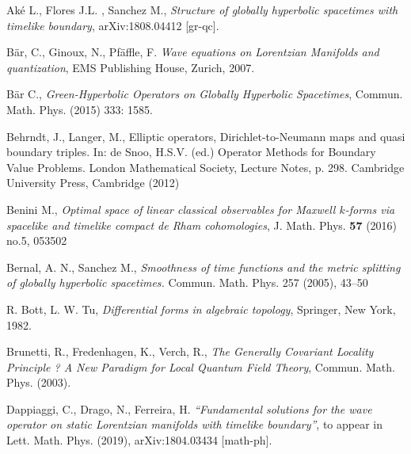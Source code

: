 \documentclass[
11pt,,a4paper %
]{book} %
\theoremstyle{TheoremStyle}
\theoremstyle{ExampleAndRemarkStyle}
\theoremstyle{ProofStyle}
\begin{document}


\begin{thebibliography}{}
	
	Ak\'e L., Flores J.L. , Sanchez M.,
	\textit{Structure of globally hyperbolic spacetimes with timelike boundary},
	arXiv:1808.04412 [gr-qc].
	
	B\"{a}r, C., Ginoux, N., Pf\"{a}ffle, F.
	\textit{Wave equations on Lorentzian Manifolds and quantization},
	EMS Publishing House,
	Zurich,
	2007.
	
	B\"ar C.,
	\textit{Green-Hyperbolic Operators on Globally Hyperbolic Spacetimes},
	Commun. Math. Phys. (2015) 333: 1585.
	
	Behrndt, J., Langer, M.,
	Elliptic operators, Dirichlet-to-Neumann maps and quasi boundary triples.
	In: de Snoo, H.S.V. (ed.) Operator Methods for Boundary Value Problems.
	London Mathematical Society, Lecture Notes, p. 298. Cambridge University Press, Cambridge (2012)
	
	Benini M.,
	\textit{Optimal space of linear classical observables for Maxwell $k$-forms via spacelike and timelike compact de Rham cohomologies},
	J. Math. Phys. {\bf 57} (2016) no.5,  053502
	
	Bernal, A. N., Sanchez M.,
	\textit{Smoothness of time functions and the metric splitting of globally hyperbolic spacetimes.} Commun. Math. Phys. 257 (2005), 43–50
	
	
	
	R. Bott, L. W. Tu,
	\textit{Differential forms in algebraic topology},
	Springer, New York, 1982.
	
	Brunetti, R., Fredenhagen, K., Verch, R.,
	\textit{The Generally Covariant Locality Principle ? A New Paradigm for Local Quantum Field Theory},
	Commun. Math. Phys. (2003).
	
	Dappiaggi, C., Drago, N., Ferreira, H.
	\emph{``Fundamental solutions for the wave operator on static Lorentzian manifolds with timelike boundary''}, to appear in Lett. Math. Phys. (2019), arXiv:1804.03434 [math-ph].
	

\end{thebibliography}
\end{document}
